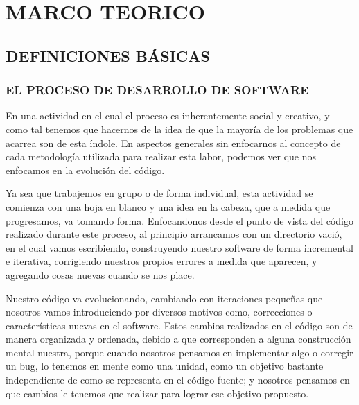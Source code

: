 

%

\chapter{MARCO TEORICO}
\section{DEFINICIONES BÁSICAS}
\subsection{EL PROCESO DE DESARROLLO DE SOFTWARE}
En una actividad en el cual el proceso es inherentemente social y creativo,  y como tal tenemos que hacernos de la idea de que la mayoría de los problemas que acarrea son de esta índole.
En aspectos generales sin enfocarnos al concepto de cada metodología utilizada para realizar esta labor, podemos ver que nos enfocamos en la evolución del código.

Ya sea que trabajemos en grupo o de forma individual, esta actividad se comienza con una hoja en blanco y una idea en la cabeza, que a medida que progresamos, va tomando forma.
Enfocandonos desde el punto de vista del código realizado durante este proceso, al principio arrancamos con un directorio vació, en el cual vamos escribiendo, construyendo nuestro software
de forma incremental e iterativa, corrigiendo nuestros propios errores a medida que aparecen, y agregando cosas nuevas cuando se nos place.

Nuestro código va evolucionando, cambiando con iteraciones pequeñas que nosotros vamos introduciendo por diversos motivos como, correcciones o características nuevas en el software.
Estos cambios realizados en el código son de manera organizada y ordenada, debido a que corresponden a alguna construcción mental nuestra, porque cuando nosotros pensamos en implementar algo o corregir un bug, lo tenemos en mente como una unidad, como un objetivo bastante independiente de como se representa en el código fuente; y nosotros 
pensamos en que cambios le tenemos que realizar para lograr ese objetivo propuesto.

